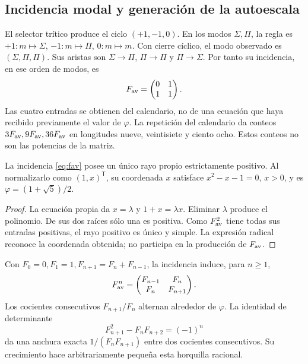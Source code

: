 \subsection{Incidencia modal y generación de la autoescala}

El selector trítico produce el ciclo \((+1,-1,0)\). En los modos \(\Sigma,\Pi\), la regla es \(+1:m\mapsto\Sigma\), \(-1:m\mapsto\Pi\), \(0:m\mapsto m\). Con cierre cíclico, el modo observado es \((\Sigma,\Pi,\Pi)\). Sus aristas son \(\Sigma\to\Pi\), \(\Pi\to\Pi\) y \(\Pi\to\Sigma\). Por tanto su incidencia, en ese orden de modos, es
\begin{equation}
 F_{\rm av}=\begin{pmatrix}0&1\\1&1\end{pmatrix}.
 \label{eq:fav}
\end{equation}
Las cuatro entradas se obtienen del calendario, no de una ecuación que haya recibido previamente el valor de \(\varphi\). La repetición del calendario da conteos \(3F_{\rm av},9F_{\rm av},36F_{\rm av}\) en longitudes nueve, veintisiete y ciento ocho. Estos conteos no son las potencias de la matriz.

\begin{theorem}
La incidencia \eqref{eq:fav} posee un único rayo propio estrictamente positivo. Al normalizarlo como \((1,x)^{\mathsf T}\), su coordenada \(x\) satisface \(x^2-x-1=0\), \(x>0\), y es \(\varphi=(1+\sqrt5)/2\).
\end{theorem}
\begin{proof}
La ecuación propia da \(x=\lambda\) y \(1+x=\lambda x\). Eliminar \(\lambda\) produce el polinomio. De sus dos raíces sólo una es positiva. Como \(F_{\rm av}^2\) tiene todas sus entradas positivas, el rayo positivo es único y simple. La expresión radical reconoce la coordenada obtenida; no participa en la producción de \(F_{\rm av}\).
\end{proof}

Con \(F_0=0,F_1=1,F_{n+1}=F_n+F_{n-1}\), la incidencia induce, para \(n\geq1\),
\[
 F_{\rm av}^n=\begin{pmatrix}F_{n-1}&F_n\\F_n&F_{n+1}\end{pmatrix}.
\]
Los cocientes consecutivos \(F_{n+1}/F_n\) alternan alrededor de \(\varphi\). La identidad de determinante
\[
 F_{n+1}^2-F_nF_{n+2}=(-1)^n
\]
da una anchura exacta \(1/(F_nF_{n+1})\) entre dos cocientes consecutivos. Su crecimiento hace arbitrariamente pequeña esta horquilla racional.

